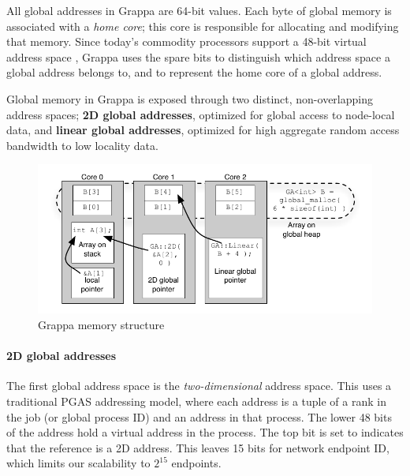 All global addresses in Grappa are 64-bit values. Each byte of global
memory is associated with a {\em home core}; this core is responsible
for allocating and modifying that memory. Since today's commodity
processors support a 48-bit virtual address space \cite{AMD64}, Grappa
uses the spare bits to distinguish which address space a global address
belongs to, and to represent the home core of a global address.

Global memory in Grappa is exposed through two distinct, non-overlapping
address spaces; \textbf{2D global addresses}, optimized for global
access to node-local data, and \textbf{linear global addresses},
optimized for high aggregate random access bandwidth to low locality
data.


\begin{figure}[t]
\begin{center}
  \includegraphics[width=0.95\columnwidth]{figs/memory-structure}
\begin{minipage}{0.95\columnwidth}
  \caption{\label{fig:memory-structure} Grappa memory structure}
\end{minipage}
\vspace{-3ex}
\end{center}
\end{figure}

\paragraph{2D global addresses} The first global address space is the {\em
two-dimensional} address space. This uses a traditional PGAS addressing model,
where each address is a tuple of a rank in the job (or global process ID) and
an address in that process. The lower 48 bits of the address hold a virtual
address in the process. The top bit is set to indicates that the reference is
a 2D address. This leaves 15 bits for network endpoint ID, which limits our
scalability to $2^{15}$ endpoints.

